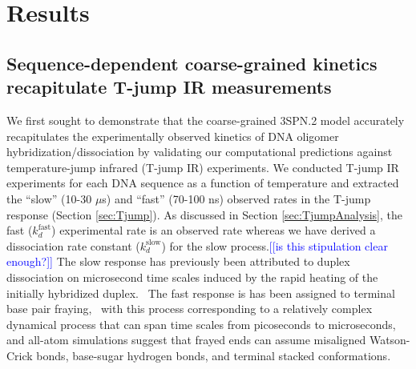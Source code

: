 \documentclass[journal=jpcbfk,manuscript=article]{achemso}
\newcommand*{\noteb}[1]{\textcolor{blue}{[[#1]]}}		%
\begin{document}


\section{\label{sec:Results}Results}

\subsection{Sequence-dependent coarse-grained kinetics recapitulate T-jump IR measurements} \label{sec:time}


We first sought to demonstrate that the coarse-grained 3SPN.2 model accurately recapitulates the experimentally observed kinetics of DNA oligomer hybridization/dissociation by validating our computational predictions against temperature-jump infrared (T-jump IR) experiments. We conducted T-jump IR experiments for each DNA sequence as a function of temperature and extracted the ``slow'' (10-30 $\mu$s) and ``fast'' (70-100 ns) observed rates in the T-jump response (Section \ref{sec:Tjump}). As discussed in Section \ref{sec:TjumpAnalysis}, the fast ($k_d^\mathrm{fast}$) experimental rate is an observed rate whereas we have derived a dissociation rate constant ($k_d^\mathrm{slow}$) for the slow process.\noteb{is this stipulation clear enough?} The slow response has previously been attributed to duplex dissociation on microsecond time scales induced by the rapid heating of the initially hybridized duplex.~\citep{Sanstead2016, Sanstead2018DirectDehybridization} The fast response is has been assigned to terminal base pair fraying,~\citep{Sanstead2016, Sanstead2018DirectDehybridization} with this process corresponding to a relatively complex dynamical process that can span time scales from picoseconds to microseconds,~\cite{Nonin1995TerminalFraying, Nikolova2012ProbingSimulations, Andreatta2006UltrafastHelix, Galindo-Murillo2015ConvergenceDGCACGAACGAACGAACGC} and all-atom simulations suggest that frayed ends can assume misaligned Watson-Crick bonds, base-sugar hydrogen bonds, and terminal stacked conformations.~\citep{PinamontiTheModels, Zgarbova2014BaseRNA} 
\end{document}
